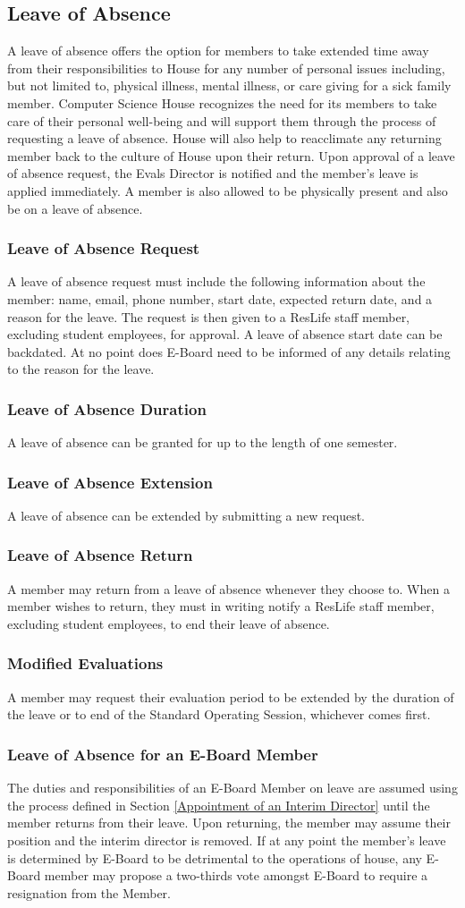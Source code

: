 \documentclass{article}
\newcommand{\asection}[1]{\subsection{#1} \label{#1}}
\newcommand{\asubsection}[1]{\subsubsection{#1} \label{#1}}
\begin{document}
\asection{Leave of Absence}
A leave of absence offers the option for members to take extended time away from their responsibilities to House for any number of personal issues including, but not limited to, physical illness, mental illness, or care giving for a sick family member.
Computer Science House recognizes the need for its members to take care of their personal well-being and will support them through the process of requesting a leave of absence.
House will also help to reacclimate any returning member back to the culture of House upon their return.
Upon approval of a leave of absence request, the Evals Director is notified and the member's leave is applied immediately.
A member is also allowed to be physically present and also be on a leave of absence.

\asubsection{Leave of Absence Request}
A leave of absence request must include the following information about the member: name, email, phone number, start date, expected return date, and a reason for the leave.
The request is then given to a ResLife staff member, excluding student employees, for approval.
A leave of absence start date can be backdated.
At no point does E-Board need to be informed of any details relating to the reason for the leave.

\asubsection{Leave of Absence Duration}
A leave of absence can be granted for up to the length of one semester.

\asubsection{Leave of Absence Extension}
A leave of absence can be extended by submitting a new request.

\asubsection{Leave of Absence Return}
A member may return from a leave of absence whenever they choose to.
When a member wishes to return, they must in writing notify a ResLife staff member, excluding student employees, to end their leave of absence.

\asubsection{Modified Evaluations}
A member may request their evaluation period to be extended by the duration of the leave or to end of the Standard Operating Session, whichever comes first.

\asubsection{Leave of Absence for an E-Board Member}
The duties and responsibilities of an E-Board Member on leave are assumed using the process defined in Section \ref{Appointment of an Interim Director} until the member returns from their leave.
Upon returning, the member may assume their position and the interim director is removed.
If at any point the member's leave is determined by E-Board to be detrimental to the operations of house, any E-Board member may propose a two-thirds vote amongst E-Board to require a resignation from the Member.
\end{document}

